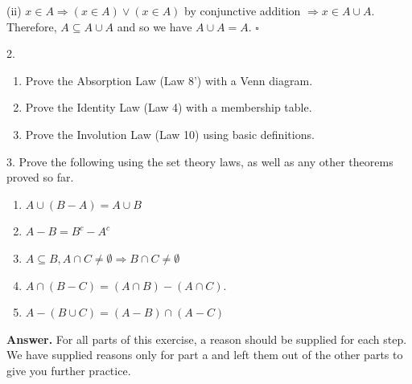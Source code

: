 \documentclass[10pt,]{book}
\theoremstyle{plain}
\theoremstyle{definition}
\theoremstyle{definition}
\theoremstyle{definition}
\begin{document}
\begin{exercisegroup}
\begin{enumerate}[label=\alph*]
(ii) \(x\in A\Rightarrow (x\in A) \lor (x\in A)\) by conjunctive addition
           \(\Rightarrow  x\in A\cup A\).
Therefore, \(A \subseteq A\cup A\) and so we have \(A\cup A=A\). \(\square\)\end{enumerate}
%
\item[2.]\hypertarget{exercise-7}{}\leavevmode%
\begin{enumerate}[label=\alph*]
\item\hypertarget{li-29}{}Prove the Absorption Law (Law 8') with a Venn diagram.%
\item\hypertarget{li-30}{}Prove the Identity Law (Law 4) with a membership table.%
\item\hypertarget{li-31}{}Prove the Involution Law (Law 10) using basic definitions.%
\end{enumerate}
%
\par\smallskip
\item[3.]\hypertarget{exercise-8}{}Prove the following using the set theory laws, as well as any other theorems proved so far.%
\par
\leavevmode%
\begin{enumerate}[label=\alph*]
\item\hypertarget{li-32}{}  \(A \cup  (B - A) = A \cup  B\)%
\item\hypertarget{li-33}{}  \(A - B = B^c - A ^c\)%
\item\hypertarget{li-34}{}  \(A\subseteq B, A\cap C \neq \emptyset  \Rightarrow  B\cap C \neq \emptyset\)%
\item\hypertarget{li-35}{}  \(A\cap (B - C) = (A\cap B) - (A\cap C)\).%
\item\hypertarget{li-36}{}  \(A - (B \cup  C) = (A - B)\cap (A - C)\)%
\end{enumerate}
%
\par\smallskip
\par\smallskip
\noindent\textbf{Answer.}\hypertarget{answer-4}{}\quad
 For all parts of this exercise, a reason should be supplied for each step. 
We have supplied reasons only for part a and left them out of the other parts to give you further practice.%
\par
\leavevmode%
\end{exercisegroup}
\end{document}
